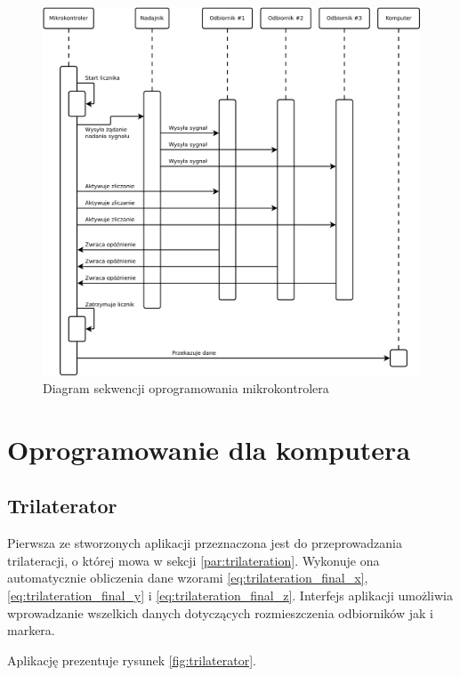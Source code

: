 \begin{figure}
 \hspace{-10em}
 \includegraphics[width=45em]{gfx/diagramy/diagram_sekwencji_sprzetu}
 \caption{Diagram sekwencji oprogramowania mikrokontrolera}
 \label{fig:firmware_sequence_diagram}
\end{figure}

\section{Oprogramowanie dla komputera}
\subsection{Trilaterator}
Pierwsza ze stworzonych aplikacji przeznaczona jest do przeprowadzania trilateracji, o której mowa w sekcji \ref{par:trilateration}. Wykonuje ona automatycznie obliczenia dane wzorami \ref{eq:trilateration_final_x}, \ref{eq:trilateration_final_y} i \ref{eq:trilateration_final_z}. Interfejs aplikacji umożliwia wprowadzanie wszelkich danych dotyczących rozmieszczenia odbiorników jak i markera.

Aplikację prezentuje rysunek \ref{fig:trilaterator}.

